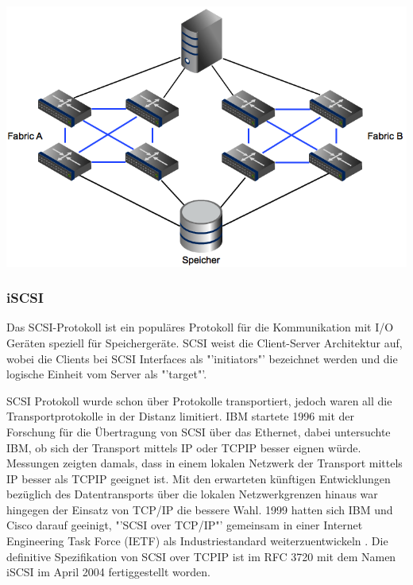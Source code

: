 \begin{center}
\includegraphics[width=\linewidth, keepaspectratio = true]{media/MashedFabric.png}
\end{center}

\subsubsection{iSCSI}
Das SCSI-Protokoll ist ein populäres Protokoll für die Kommunikation mit I/O Geräten speziell für Speichergeräte. SCSI weist die Client-Server Architektur auf, wobei die Clients bei SCSI Interfaces als "'initiators"' bezeichnet werden und die logische Einheit vom Server als "'target"'.

SCSI Protokoll wurde schon über Protokolle transportiert, jedoch waren all die Transportprotokolle in der Distanz limitiert. \gls{IBM} startete 1996 mit der Forschung für die Übertragung von SCSI über das Ethernet, dabei untersuchte \gls{IBM}, ob sich der Transport mittels IP oder \gls{TCPIP} besser eignen würde. Messungen zeigten damals, dass in einem lokalen Netzwerk der Transport mittels IP besser als \gls{TCPIP} geeignet ist. Mit den erwarteten künftigen Entwicklungen bezüglich des Datentransports über die lokalen Netzwerkgrenzen hinaus war hingegen der Einsatz von TCP/IP die bessere Wahl. 1999 hatten sich \gls{IBM} und \gls{Cisco} darauf geeinigt, "'SCSI over TCP/IP"' gemeinsam in einer Internet Engineering Task Force (\gls{IETF}) als Industriestandard weiterzuentwickeln \cite{JohnL.202}. Die definitive Spezifikation von SCSI over \gls{TCPIP} ist im \gls{RFC} 3720 mit dem Namen iSCSI im April 2004 fertiggestellt worden. \cite{J.Satran2004}

